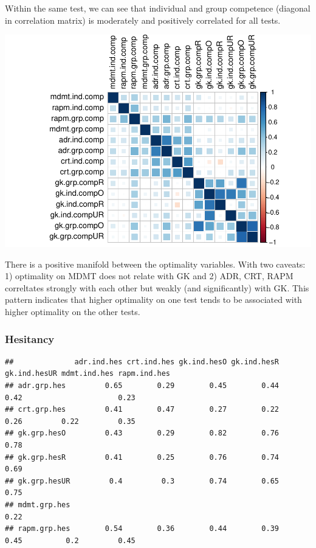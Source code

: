 \documentclass[]{article}
\begin{document}
Within the same test, we can see that individual and group competence
(diagonal in correlation matrix) is moderately and positively correlated
for all tests.

\includegraphics{corr_analyses_files/figure-latex/competence2-1.pdf}

There is a positive manifold between the optimality variables. With two
caveats: 1) optimality on MDMT does not relate with GK and 2) ADR, CRT,
RAPM correltates strongly with each other but weakly (and significantly)
with GK. This pattern indicates that higher optimality on one test tends
to be associated with higher optimality on the other tests.

\subsubsection{Hesitancy}\label{hesitancy}

\begin{verbatim}
##              adr.ind.hes crt.ind.hes gk.ind.hesO gk.ind.hesR gk.ind.hesUR mdmt.ind.hes rapm.ind.hes
## adr.grp.hes         0.65        0.29        0.45        0.44         0.42                      0.23
## crt.grp.hes         0.41        0.47        0.27        0.22         0.26         0.22         0.35
## gk.grp.hesO         0.43        0.29        0.82        0.76         0.78                          
## gk.grp.hesR         0.41        0.25        0.76        0.74         0.69                          
## gk.grp.hesUR         0.4         0.3        0.74        0.65         0.75                          
## mdmt.grp.hes                                                                      0.22             
## rapm.grp.hes        0.54        0.36        0.44        0.39         0.45          0.2         0.45
\end{verbatim}
\end{document}
